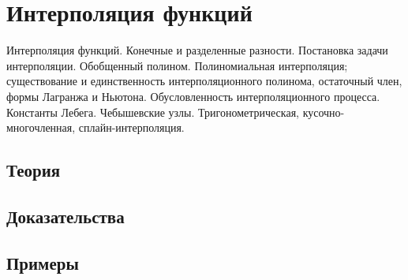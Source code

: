 
\section{Интерполяция функций}
\label{sec:2.1.09-interpolation}

\begin{ticket}
Интерполяция функций. Конечные и разделенные разности. Постановка задачи интерполяции. Обобщенный полином. Полиномиальная интерполяция; существование и единственность интерполяционного полинома, остаточный член, формы Лагранжа и Ньютона. Обусловленность интерполяционного процесса. Константы Лебега. Чебышевские узлы. Тригонометрическая, кусочно-многочленная, сплайн-интерполяция.
\end{ticket}

\subsection*{Теория}

\subsection*{Доказательства}

\subsection*{Примеры}
